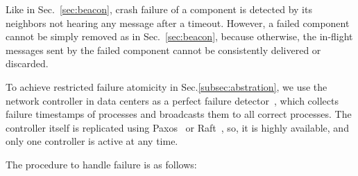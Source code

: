 Like in Sec.~\ref{sec:beacon}, crash failure of a component is detected by its neighbors not hearing any message after a timeout.
However, a failed component cannot be simply removed as in Sec.~\ref{sec:beacon}, because otherwise, the in-flight messages sent by the failed component cannot be consistently delivered or discarded.

To achieve restricted failure atomicity in Sec.\ref{subsec:abstration}, we use the network controller in data centers as a perfect failure detector~\cite{chandra1996unreliable}, which collects failure timestamps of processes and broadcasts them to all correct processes.
The controller itself is replicated using Paxos~\cite{lamport1998part} or Raft~\cite{raft}, so, it is highly available, and only one controller is active at any time.

The procedure to handle failure is as follows:

